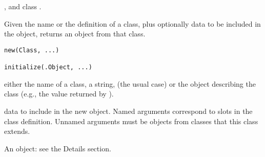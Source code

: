 %
\begin{SeeAlso}\relax
  , and
class .
\end{SeeAlso}
%
\begin{Description}\relax
Given the name or the definition of a class, plus optionally data
to be included in the object,  returns an object from that
class.
\end{Description}
%
\begin{Usage}
\begin{verbatim}
new(Class, ...)

initialize(.Object, ...)
\end{verbatim}
\end{Usage}
%
\begin{Arguments}
\begin{ldescription}
\item[\code{Class}] either the name of a class, a 
string, (the usual case) or the object describing the class (e.g.,
the value returned by ).
\item[\code{...}] data to include in the new object.  Named arguments
correspond to slots in the class definition. Unnamed arguments must
be objects from classes that this class extends.
\item[\code{.Object}]  An object:  see the Details section.
\end{ldescription}
\end{Arguments}
%
